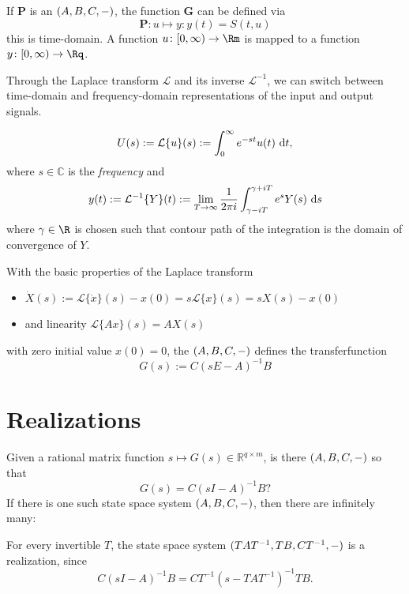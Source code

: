\documentclass[a4paper,10pt]{article}
\theoremstyle{definition}
\begin{document}
If $\mathbf P$ is an $(A,B,C,-)$, the function $\mathbf G$ can be defined via 
\begin{equation*}
	\mathbf P \colon u \mapsto y\colon y(t) = S(t, u)
\end{equation*}
this is time-domain. A function $u \colon [0, \infty) \to \Rm$ is mapped to a function $y\colon [0, \infty)  \to \Rq$.

Through the Laplace transform $\mathcal L$ and its inverse $\mathcal L^{-1}$, we can switch between time-domain and frequency-domain representations of the input and output signals.

\begin{equation*}
	U(s) := \mathcal L\{u\}(s) := \int_0^\infty e^{-st}u(t)\text{~\textup{d}} t,
\end{equation*}
where $s\in \mathbb C$ is the \emph{frequency} and
\begin{equation*}
	y(t) := \mathcal L^{-1}\{Y\}(t) := \lim_{T\to \infty} \frac 1{2\pi i} \int_{\gamma - iT}^{\gamma + iT} e^{s}Y(s)\text{~\textup{d}} s
\end{equation*}
where $\gamma \in \R$ is chosen such that contour path of the integration is the domain of convergence of $Y$.

With the basic properties of the Laplace transform
\begin{itemize}
	\item $\dot X(s):= \mathcal L\{\dot x\}(s) -x(0)= s\mathcal L\{x\}(s) = s X(s)-x(0)$
	\item and linearity $\mathcal L\{Ax\}(s) = AX(s)$
\end{itemize}
with zero initial value $x(0) = 0$, the $(A,B,C,-)$ defines the transferfunction
\begin{equation*}
	G(s) := C(sE-A)^{-1}B
\end{equation*}

\section{Realizations}
Given a rational matrix function $s\mapsto G(s)\in \mathbb R^{q\times m}$, is there $(A,B,C,-)$ so that 
\begin{equation*}
	G(s) = C(sI-A)^{-1}B ?
\end{equation*}
If there is one such state space system $(A,B,C,-)$, then there are infinitely many:

For every invertible $T$, the state space system $(TAT^{-1},TB,CT^{-1},-)$ is a realization, since
\begin{equation*}
	C(sI-A)^{-1}B = CT^{-1}(s-TAT^{-1})^{-1}TB.
\end{equation*}
\end{document}

